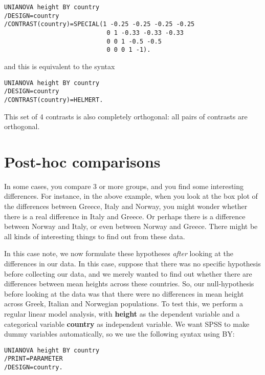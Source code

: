 \begin{verbatim}
UNIANOVA height BY country
/DESIGN=country
/CONTRAST(country)=SPECIAL(1 -0.25 -0.25 -0.25 -0.25
                            0 1 -0.33 -0.33 -0.33
                            0 0 1 -0.5 -0.5
                            0 0 0 1 -1).
\end{verbatim}

and this is equivalent to the syntax 

\begin{verbatim}
UNIANOVA height BY country
/DESIGN=country
/CONTRAST(country)=HELMERT.
\end{verbatim}


This set of 4 contrasts is also completely orthogonal: all pairs of contrasts are orthogonal.





\section{Post-hoc comparisons}

In some cases, you compare 3 or more groups, and you find some interesting differences. For instance, in the above example, when you look at the box plot of the  differences between Greece, Italy and Norway, you might wonder whether there is a real difference in Italy and Greece. Or perhaps there is a difference between Norway and Italy, or even between Norway and Greece. There might be all kinds of interesting things to find out from these data.

In this case note, we now formulate these hypotheses \textit{after} looking at the differences in our data. In this case, suppose that there was no specific hypothesis before collecting our data, and we merely wanted to find out whether there are differences between mean heights across these countries. So, our null-hypothesis before looking at the data was that there were no differences in mean height across Greek, Italian and Norwegian populations. To test this, we perform a regular linear model analysis, with \textbf{height} as the dependent variable and a categorical variable \textbf{country} as independent variable. We want SPSS to make dummy variables automatically, so we use the following syntax using BY:

\begin{verbatim}
UNIANOVA height BY country
/PRINT=PARAMETER
/DESIGN=country.
\end{verbatim}



